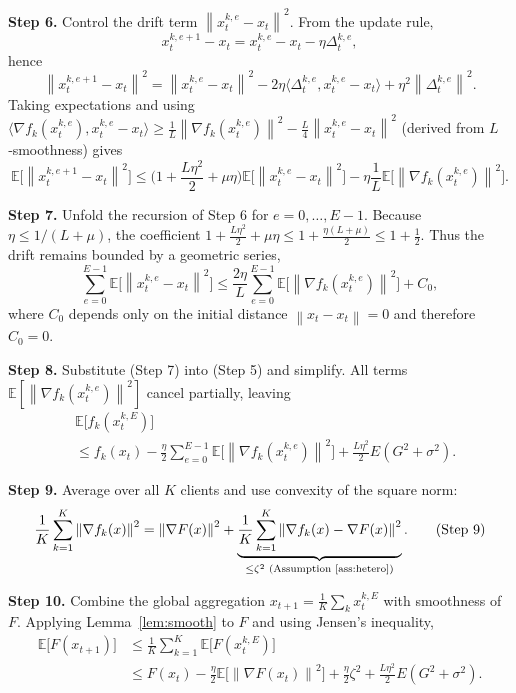 \documentclass{article}
\newcommand{\E}{\mathbb{E}}
\newcommand{\norm}[1]{\left\|#1\right\|}
\newcommand{\inner}[2]{\langle #1,#2\rangle}
\begin{document}
\noindent\textbf{Step 6.} Control the drift term $\norm{x_{t}^{k,e}-x_t}^2$.  
From the update rule,
\[
x_{t}^{k,e+1}-x_t = x_{t}^{k,e}-x_t-\eta\Delta_{t}^{k,e},
\]
hence
\[
\norm{x_{t}^{k,e+1}-x_t}^2
= \norm{x_{t}^{k,e}-x_t}^2-2\eta\inner{\Delta_{t}^{k,e}}{x_{t}^{k,e}-x_t}
+\eta^2\norm{\Delta_{t}^{k,e}}^2 .
\]
Taking expectations and using $\inner{\nabla f_k(x_{t}^{k,e})}{x_{t}^{k,e}-x_t}
\ge \frac{1}{L}\norm{\nabla f_k(x_{t}^{k,e})}^2-\frac{L}{4}\norm{x_{t}^{k,e}-x_t}^2$
(derived from $L$‑smoothness) gives
\[
\E\!\big[\norm{x_{t}^{k,e+1}-x_t}^2\big]
\le\Big(1+\frac{L\eta^2}{2}+\mu\eta\Big)\E\!\big[\norm{x_{t}^{k,e}-x_t}^2\big]
-\eta\frac{1}{L}\E\!\big[\norm{\nabla f_k(x_{t}^{k,e})}^2\big].
\tag{Step 6}
\]

\noindent\textbf{Step 7.} Unfold the recursion of Step 6 for $e=0,\dots,E-1$.
Because $\eta\le 1/(L+\mu)$, the coefficient
$1+\frac{L\eta^2}{2}+\mu\eta\le 1+\frac{\eta(L+\mu)}{2}\le 1+\frac12$.
Thus the drift remains bounded by a geometric series,
\[
\sum_{e=0}^{E-1}\E\!\big[\norm{x_{t}^{k,e}-x_t}^2\big]
\le \frac{2\eta}{L}\sum_{e=0}^{E-1}\E\!\big[\norm{\nabla f_k(x_{t}^{k,e})}^2\big]
+ C_0,
\tag{Step 7}
\]
where $C_0$ depends only on the initial distance $\norm{x_t-x_t}=0$ and therefore $C_0=0$.

\noindent\textbf{Step 8.} Substitute (Step 7) into (Step 5) and simplify.
All terms $\E[\norm{\nabla f_k(x_{t}^{k,e})}^2]$ cancel partially, leaving
\[
\begin{aligned}
&\E\!\big[f_k(x_{t}^{k,E})\big]\\
&\le f_k(x_t)
-\frac{\eta}{2}\sum_{e=0}^{E-1}\E\!\big[\norm{\nabla f_k(x_{t}^{k,e})}^2\big]
+\frac{L\eta^2}{2}E(G^2+\sigma^2).
\end{aligned}
\tag{Step 8}
\]

\noindent\textbf{Step 9.} Average over all $K$ clients and use convexity of the square norm:
\[
\frac1K\sum_{k=1}^K \norm{\nabla f_k(x)}^2
= \norm{\nabla F(x)}^2+\underbrace{\frac1K\sum_{k=1}^K
\norm{\nabla f_k(x)-\nabla F(x)}^2}_{\le\zeta^2\text{ (Assumption~\ref{ass:hetero})}} .
\tag{Step 9}
\]

\noindent\textbf{Step 10.} Combine the global aggregation $x_{t+1}= \frac1K\sum_k x_{t}^{k,E}$ with smoothness of $F$.
Applying Lemma~\ref{lem:smooth} to $F$ and using Jensen’s inequality,
\[
\begin{aligned}
\E\!\big[F(x_{t+1})\big]
&\le \frac1K\sum_{k=1}^K\E\!\big[F(x_{t}^{k,E})\big]\\
&\le F(x_t)
-\frac{\eta}{2}\E\!\big[\norm{\nabla F(x_t)}^2\big]
+\frac{\eta}{2}\zeta^2
+\frac{L\eta^2}{2}E(G^2+\sigma^2).
\end{aligned}
\tag{Step 10}
\]
\end{document}
